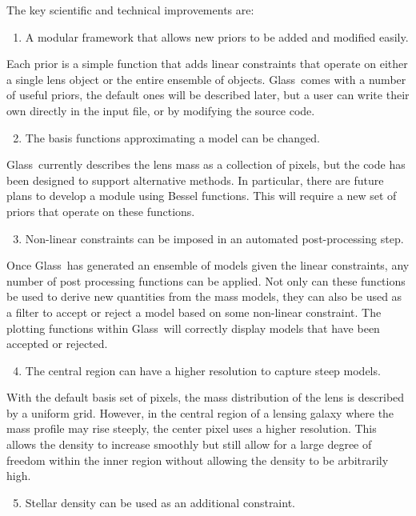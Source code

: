 \documentclass[galley,usenatbib]{mn2e}
\newcommand{\Glass}{{\sc Glass}}
\begin{document}
The key scientific and technical improvements are:
%
\begin{enumerate}
  \setcounter{enumi}{0}
  \item A modular framework that allows new priors to be added and modified easily.
\end{enumerate}
%
Each prior is a simple function that adds linear constraints that operate on
either a single lens object or the entire ensemble of objects. \Glass\ comes
with a number of useful priors, the default ones will be described later, but a
user can write their own directly in the input file, or by modifying the source
code.
%
\begin{enumerate}
  \setcounter{enumi}{1}
  \item The basis functions approximating a model can be changed. 
\end{enumerate}
%
\Glass\ currently describes the lens mass as a collection of pixels, but the
code has been designed to support alternative methods. In particular, there are
future plans to develop a module using Bessel functions. This will require a
new set of priors that operate on these functions.
%
\begin{enumerate}
  \setcounter{enumi}{2}
  \item Non-linear constraints can be imposed in an automated post-processing step. 
\end{enumerate}
%
Once \Glass\ has generated an ensemble of models given the linear constraints,
any number of post processing functions can be applied. Not only can these
functions be used to derive new quantities from the mass models, they can also
be used as a filter to accept or reject a model based on some non-linear
constraint. The plotting functions within \Glass\ will correctly display models
that have been accepted or rejected.
%
\begin{enumerate}
  \setcounter{enumi}{3}
  \item The central region can have a higher resolution to capture steep models. 
\end{enumerate}
%
With the default basis set of pixels, the mass distribution of the lens is
described by a uniform grid. However, in the central region of a lensing galaxy
where the mass profile may rise steeply, the center pixel uses a higher
resolution. This allows the density to increase smoothly but still allow for a
large degree of freedom within the inner region without allowing the density to
be arbitrarily high. 
%
\begin{enumerate}
  \setcounter{enumi}{4}
  \item Stellar density can be used as an additional constraint.  
\end{enumerate}
\end{document}
